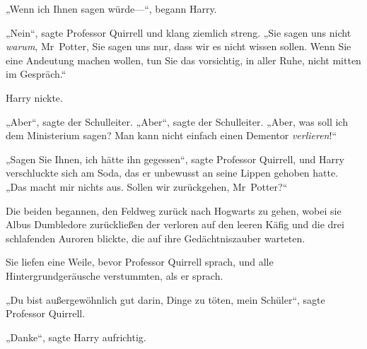 „Wenn ich Ihnen sagen würde—“, begann Harry.

„Nein“, sagte Professor Quirrell und klang ziemlich streng. „Sie sagen uns nicht \emph{warum}, Mr~Potter, Sie sagen uns nur, dass wir es nicht wissen sollen. Wenn Sie eine Andeutung machen wollen, tun Sie das vorsichtig, in aller Ruhe, nicht mitten im Gespräch.“

Harry nickte.

„Aber“, sagte der Schulleiter. „Aber“, sagte der Schulleiter. „Aber, was soll ich dem Ministerium sagen? Man kann nicht einfach einen Dementor \emph{verlieren}!“

„Sagen Sie Ihnen, ich hätte ihn gegessen“, sagte Professor Quirrell, und Harry verschluckte sich am Soda, das er unbewusst an seine Lippen gehoben hatte. „Das macht mir nichts aus. Sollen wir zurückgehen, Mr~Potter?“

Die beiden begannen, den Feldweg zurück nach Hogwarts zu gehen, wobei sie Albus Dumbledore zurückließen der verloren auf den leeren Käfig und die drei schlafenden Auroren blickte, die auf ihre Gedächtniszauber warteten.


Sie liefen eine Weile, bevor Professor Quirrell sprach, und alle Hintergrundgeräusche verstummten, als er sprach.

„Du bist außergewöhnlich gut darin, Dinge zu töten, mein Schüler“, sagte Professor Quirrell.

„Danke“, sagte Harry aufrichtig.


